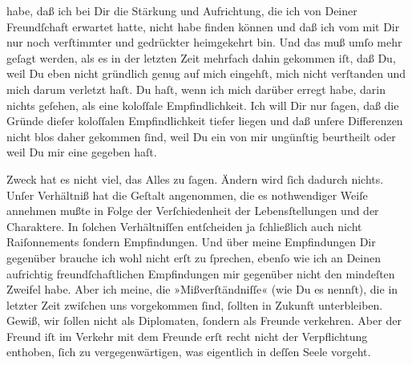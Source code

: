                habe, daß {\pb}ich bei Dir die Stärkung und Aufrichtung,
               die ich von Deiner Freundſchaft erwartet hatte, nicht habe finden können und daß ich
               vom \label{K_L03194-2v}\label{K_L03194-2h} mit Dir nur noch verſtimmter und gedrückter heimgekehrt bin. Und das muß umſo
               mehr geſagt werden, als es in der letzten Zeit mehrfach dahin gekommen iſt, daß Du,
               weil Du eben nicht gründlich genug auf mich eingehſt, mich \strikeout{\textcolor{gray}{×}\-\textcolor{gray}{×}} nicht verſtanden und mich darum verletzt haſt. Du haſt, wenn ich mich darüber
               erregt habe, darin nichts geſehen, als eine koloſſale Empfindlichkeit. Ich will Dir
               nur ſagen, daß die Gründe dieſer koloſſalen Empfindlichkeit tiefer liegen und daß
               unſere Differenzen nicht blos daher gekommen ſind, weil Du ein \label{K_L03194-11v}\label{K_L03194-11h} von mir ungünſtig beurtheilt  oder weil Du mir eine \label{K_L03194-12v}\label{K_L03194-12h} gegeben haſt.\pend
           
\pstart
           Zweck hat es nicht viel, das Alles zu ſagen. Ändern wird ſich dadurch nichts. Unſer
               Verhältniß hat die Geſtalt angenommen, {\pb}die es
               nothwendiger Weiſe annehmen mußte in Folge der Verſchiedenheit der Lebensſtellungen
               und der Charaktere. In ſolchen Verhältniſſen entſcheiden ja ſchließlich auch nicht
               Raiſonnements ſondern Empfindungen. Und über meine Empfindungen Dir gegenüber brauche
               ich wohl nicht erſt zu ſprechen, ebenſo wie ich an Deinen aufrichtig
               freundſchaftlichen Empfindungen  mir gegenüber
               nicht den mindeſten Zweifel habe. Aber ich meine, die »Mißverſtändniſſe« (wie Du es
               nennſt), die in letzter Zeit zwiſchen uns vorgekommen ſind, ſollten in Zukunft
               unterbleiben. Gewiß, wir ſollen nicht als Diplomaten, ſondern als Freunde verkehren.
               Aber der Freund iſt im Verkehr mit dem Freunde erſt recht nicht
               der Verpflichtung enthoben, ſich zu vergegenwärtigen, was eigentlich in deſſen Seele
               vorgeht.\pend
           
